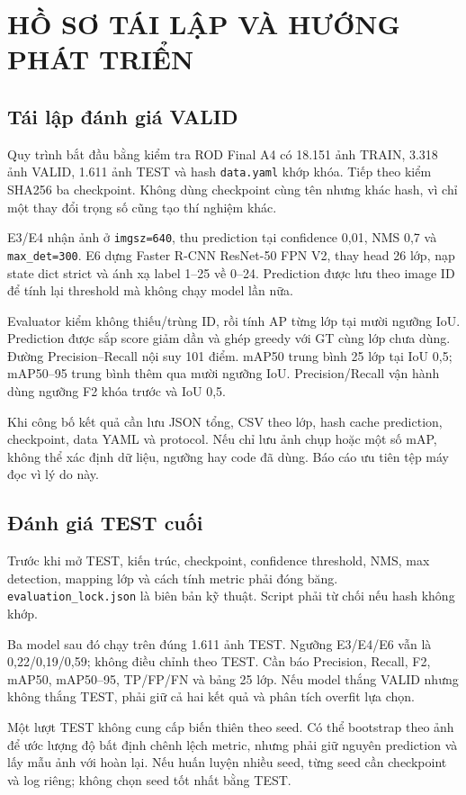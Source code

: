 \appendix
\chapter{HỒ SƠ TÁI LẬP VÀ HƯỚNG PHÁT TRIỂN}
\section{Tái lập đánh giá VALID}
Quy trình bắt đầu bằng kiểm tra ROD Final A4 có 18.151 ảnh TRAIN, 3.318 ảnh VALID, 1.611 ảnh TEST và hash \texttt{data.yaml} khớp khóa. Tiếp theo kiểm SHA256 ba checkpoint. Không dùng checkpoint cùng tên nhưng khác hash, vì chỉ một thay đổi trọng số cũng tạo thí nghiệm khác.

E3/E4 nhận ảnh ở \texttt{imgsz=640}, thu prediction tại confidence 0,01, NMS 0,7 và \texttt{max\_det=300}. E6 dựng Faster R-CNN ResNet-50 FPN V2, thay head 26 lớp, nạp state dict strict và ánh xạ label 1--25 về 0--24. Prediction được lưu theo image ID để tính lại threshold mà không chạy model lần nữa.

Evaluator kiểm không thiếu/trùng ID, rồi tính AP từng lớp tại mười ngưỡng IoU. Prediction được sắp score giảm dần và ghép greedy với GT cùng lớp chưa dùng. Đường Precision--Recall nội suy 101 điểm. mAP50 trung bình 25 lớp tại IoU 0,5; mAP50--95 trung bình thêm qua mười ngưỡng IoU. Precision/Recall vận hành dùng ngưỡng F2 khóa trước và IoU 0,5.

Khi công bố kết quả cần lưu JSON tổng, CSV theo lớp, hash cache prediction, checkpoint, data YAML và protocol. Nếu chỉ lưu ảnh chụp hoặc một số mAP, không thể xác định dữ liệu, ngưỡng hay code đã dùng. Báo cáo ưu tiên tệp máy đọc vì lý do này.

\section{Đánh giá TEST cuối}
Trước khi mở TEST, kiến trúc, checkpoint, confidence threshold, NMS, max detection, mapping lớp và cách tính metric phải đóng băng. \texttt{evaluation\_lock.json} là biên bản kỹ thuật. Script phải từ chối nếu hash không khớp.

Ba model sau đó chạy trên đúng 1.611 ảnh TEST. Ngưỡng E3/E4/E6 vẫn là 0,22/0,19/0,59; không điều chỉnh theo TEST. Cần báo Precision, Recall, F2, mAP50, mAP50--95, TP/FP/FN và bảng 25 lớp. Nếu model thắng VALID nhưng không thắng TEST, phải giữ cả hai kết quả và phân tích overfit lựa chọn.

Một lượt TEST không cung cấp biến thiên theo seed. Có thể bootstrap theo ảnh để ước lượng độ bất định chênh lệch metric, nhưng phải giữ nguyên prediction và lấy mẫu ảnh với hoàn lại. Nếu huấn luyện nhiều seed, từng seed cần checkpoint và log riêng; không chọn seed tốt nhất bằng TEST.

